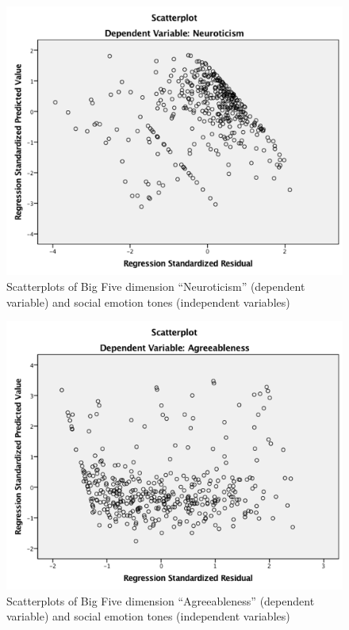 \documentclass[graybox]{svmult}
\begin{document}
{\begin{figure}[H]
\centering
\includegraphics[width=0.8\columnwidth]{images/neuroticismplot.png}
\caption{Scatterplots of Big Five dimension ``Neuroticism'' (dependent variable) and
  social emotion tones (independent variables)}
\label{fig:neuroticismplot} 
\end{figure}

\begin{figure}[H]
\centering
\includegraphics[width=0.8\columnwidth]{images/agreeablenessplot.png}
\caption{Scatterplots of Big Five dimension ``Agreeableness'' (dependent variable) and
  social emotion tones (independent variables)}
\label{fig:agreeablenessplot} 
\end{figure}


\begin{table}[ht]
\centering
{}
\end{table}}
\end{document}
